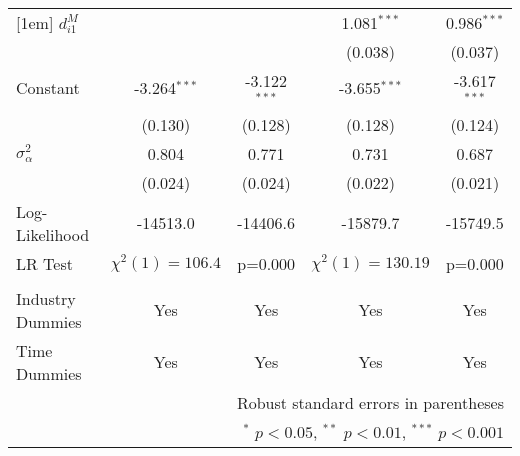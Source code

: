 \begin{center}
\begin{tabular}{l*{4}{c}}
[1em]
$d_{i1}^{M}$    &                     &                     &       1.081$^{***}$&       0.986$^{***}$\\
            &                     &                     &    (0.038)         &    (0.037)         \\
[1em]
Constant      &      -3.264$^{***}$&      -3.122$^{***}$&      -3.655$^{***}$&      -3.617$^{***}$\\
            &     (0.130)         &     (0.128)         &     (0.128)         &     (0.124)         \\
\hline
$\sigma^{2}_{\alpha}$     &       0.804         &       0.771         &       0.731 &       0.687         \\
                & (0.024) & (0.024)&(0.022) & (0.021)\\
Log-Likelihood          &    -14513.0         &    -14406.6         &
                                                                      -15879.7
                                    &    -15749.5         \\
LR Test & $\chi^{2}(1)= 106.4 $ &p=0.000& $\chi^{2}(1)=130.19$
                                           & p=0.000 \\
& & &&\\

\hline
\hline
Industry Dummies & Yes& Yes& Yes& Yes\\
Time Dummies& Yes& Yes& Yes& Yes\\
\hline\hline
\multicolumn{5}{r}{\footnotesize Robust standard errors  in parentheses}\\
\multicolumn{5}{r}{\footnotesize $^{*}$ \(p<0.05\), $^{**}$ \(p<0.01\), $^{***}$ \(p<0.001\)}\\
\end{tabular}
\end{center}
